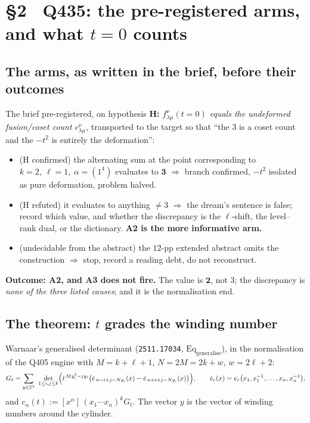 \documentclass[11pt]{article}
\theoremstyle{plain}
\theoremstyle{definition}
\newcommand{\edot}{\dot{e}}
\begin{document}
\section{\S2 \ Q435: the pre-registered arms, and what $t=0$ counts}

\subsection{The arms, as written in the brief, before their outcomes}

The brief pre-registered, on hypothesis
\textbf{H:} \emph{$f^\nu_{\lambda\mu}(t=0)$ equals the undeformed fusion/coset count
$c^\nu_{\lambda\mu}$}, transported to the target so that ``the $3$ is a coset count and the
$-t^2$ is entirely the deformation'':
\begin{itemize}
\item[\textbf{A1}] (H confirmed) the alternating sum at the point corresponding to
$k=2,\ \ell=1,\ \alpha=(1^4)$ evaluates to $\mathbf{3}$ $\Rightarrow$ branch confirmed,
$-t^2$ isolated as pure deformation, problem halved.
\item[\textbf{A2}] (H refuted) it evaluates to anything $\neq3$ $\Rightarrow$ the dream's
sentence is false; record which value, and whether the discrepancy is the $\ell$-shift, the
level--rank dual, or the dictionary. \textbf{A2 is the more informative arm.}
\item[\textbf{A3}] (undecidable from the abstract) the $12$-pp extended abstract omits the
construction $\Rightarrow$ stop, record a reading debt, do not reconstruct.
\end{itemize}

\textbf{Outcome: A2, and A3 does not fire.} The value is $\mathbf{2}$, not $3$; the
discrepancy is \emph{none of the three listed causes}; and it is the normalisation end.

\subsection{The theorem: $t$ grades the winding number}

Warnaar's generalised determinant (\texttt{2511.17034}, $\mathrm{Eq}_{\mathrm{generalise}}$),
in the normalisation of the Q405 engine with $M=k+\ell+1$, $N=2M=2k+w$, $w=2\ell+2$:
\begin{equation}\label{eq:G}
  G_t=\sum_{y\in\mathbb{Z}^k}\ \det_{1\le i,j\le k}
  \Bigl( t^{\,M y_i^2-j y_i}\bigl(\edot_{\,n-i+j-N y_i}(x)-\edot_{\,n+i+j-N y_i}(x)\bigr)\Bigr),
  \qquad \edot_r(x)=e_r\bigl(x_1,x_1^{-1},\dots,x_n,x_n^{-1}\bigr),
\end{equation}
and $c_\alpha(t):=[x^\alpha]\,(x_1\cdots x_n)^k G_t$. The vector $y$ is the vector of winding
numbers around the cylinder.
\end{document}
